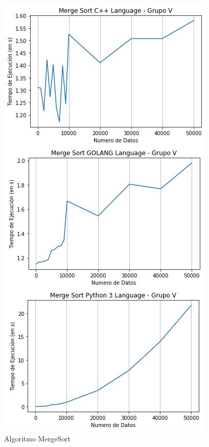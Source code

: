 \documentclass{article}
\begin{document}
 
    \begin{figure}[H]
        \centering
        \includegraphics[scale=0.6]{img/finalmerg.png}
        \caption{Algoritmo MergeSort}
        \label{fig:my_label}
    \end{figure}
\end{document}
